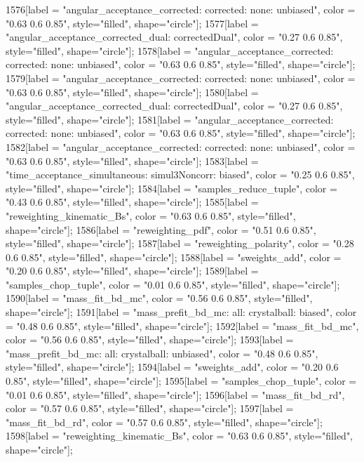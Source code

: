{	1576[label = "angular_acceptance_corrected\nangacc: corrected\ncsp: none\ntrigger: unbiased", color = "0.63 0.6 0.85", style="filled", shape="circle"];
	1577[label = "angular_acceptance_corrected_dual\nstep: correctedDual", color = "0.27 0.6 0.85", style="filled", shape="circle"];
	1578[label = "angular_acceptance_corrected\nangacc: corrected\ncsp: none\ntrigger: unbiased", color = "0.63 0.6 0.85", style="filled", shape="circle"];
	1579[label = "angular_acceptance_corrected\nangacc: corrected\ncsp: none\ntrigger: unbiased", color = "0.63 0.6 0.85", style="filled", shape="circle"];
	1580[label = "angular_acceptance_corrected_dual\nstep: correctedDual", color = "0.27 0.6 0.85", style="filled", shape="circle"];
	1581[label = "angular_acceptance_corrected\nangacc: corrected\ncsp: none\ntrigger: unbiased", color = "0.63 0.6 0.85", style="filled", shape="circle"];
	1582[label = "angular_acceptance_corrected\nangacc: corrected\ncsp: none\ntrigger: unbiased", color = "0.63 0.6 0.85", style="filled", shape="circle"];
	1583[label = "time_acceptance_simultaneous\ntimeacc: simul3Noncorr\ntrigger: biased", color = "0.25 0.6 0.85", style="filled", shape="circle"];
	1584[label = "samples_reduce_tuple", color = "0.43 0.6 0.85", style="filled", shape="circle"];
	1585[label = "reweighting_kinematic_Bs", color = "0.63 0.6 0.85", style="filled", shape="circle"];
	1586[label = "reweighting_pdf", color = "0.51 0.6 0.85", style="filled", shape="circle"];
	1587[label = "reweighting_polarity", color = "0.28 0.6 0.85", style="filled", shape="circle"];
	1588[label = "sweights_add", color = "0.20 0.6 0.85", style="filled", shape="circle"];
	1589[label = "samples_chop_tuple", color = "0.01 0.6 0.85", style="filled", shape="circle"];
	1590[label = "mass_fit_bd_mc", color = "0.56 0.6 0.85", style="filled", shape="circle"];
	1591[label = "mass_prefit_bd_mc\nmassbin: all\nmassmodel: crystalball\ntrigger: biased", color = "0.48 0.6 0.85", style="filled", shape="circle"];
	1592[label = "mass_fit_bd_mc", color = "0.56 0.6 0.85", style="filled", shape="circle"];
	1593[label = "mass_prefit_bd_mc\nmassbin: all\nmassmodel: crystalball\ntrigger: unbiased", color = "0.48 0.6 0.85", style="filled", shape="circle"];
	1594[label = "sweights_add", color = "0.20 0.6 0.85", style="filled", shape="circle"];
	1595[label = "samples_chop_tuple", color = "0.01 0.6 0.85", style="filled", shape="circle"];
	1596[label = "mass_fit_bd_rd", color = "0.57 0.6 0.85", style="filled", shape="circle"];
	1597[label = "mass_fit_bd_rd", color = "0.57 0.6 0.85", style="filled", shape="circle"];
	1598[label = "reweighting_kinematic_Bs", color = "0.63 0.6 0.85", style="filled", shape="circle"];
}
